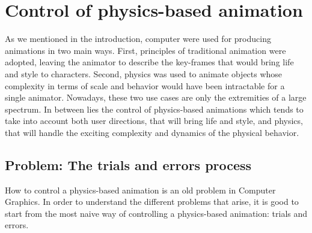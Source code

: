 \section{Control of physics-based animation}
\label{sec:starSimulationControl}

As we mentioned in the introduction, computer were used for producing animations in two main ways. 
First, principles of traditional animation were adopted, leaving the animator to describe the key-frames that would bring life and style to characters. 
Second, physics was used to animate objects whose complexity in terms of scale and behavior would have been intractable for a single animator. 
Nowadays, these two use cases are only the extremities of a large spectrum. 
In between lies the control of physics-based animations which tends to take into account both user directions, that will bring life and style, and physics, that will handle the exciting complexity and dynamics of the physical behavior.

\subsection{Problem: The trials and errors process}

How to control a physics-based animation is an old problem in Computer Graphics. In order to understand the different problems that arise, it is good to start from the most naive way of controlling a physics-based animation: trials and errors. 

